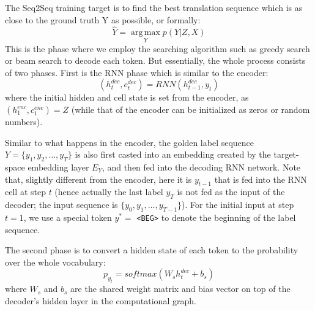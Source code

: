 \documentclass[11pt,a4paper]{article}
\begin{document}
The Seq2Seq training target is to find the best translation sequence which is as close to the ground truth Y as possible, or formally:
  \begin{equation}
      \widehat{Y} = \operatorname*{arg\,max}_{Y} p(Y|Z, X) 
  \end{equation}
This is the phase where we employ the searching algorithm such as greedy search or beam search to decode each token. But essentially, the whole process consists of two phases. First is the RNN phase which is similar to the encoder: 
  \begin{equation}
      (h^{dec}_t, c^{dec}_t) = RNN(h^{dec}_{t-1}, y_t) \label{eq:rnn_dec}
  \end{equation}
where the initial hidden and cell state is set from the encoder, as $(h^{enc}_1, c^{enc}_1) = Z$ (while that of the encoder can be initialized as zeros or random numbers). 

Similar to what happens in the encoder, the golden label sequence $Y = \{y_1, y_2, \dots, y_{T}\}$ is also first casted into an embedding created by the target-space embedding layer $E_Y$, and then fed into the decoding RNN network. Note that, slightly different from the encoder, here it is $y_{t-1}$ that is fed into the RNN cell at step $t$ (hence actually the last label $y_{T}$ is not fed as the input of the decoder; the input sequence is $\{y_0, y_1, \dots, y_{T-1}\}$). For the initial input at step $t = 1$, we use a special token $y^* =$ \texttt{<BEG>} to denote the beginning of the label sequence.

The second phase is to convert a hidden state of each token to the probability over the whole vocabulary: 
  \begin{equation}
      p_{y_t} = softmax(W_{s} h^{dec}_t + b_{s}) \label{eq:pt}
  \end{equation}
where $W_{s}$ and $b_{s}$ are the shared weight matrix and bias vector on top of the decoder's hidden layer in the computational graph. 
\end{document}
